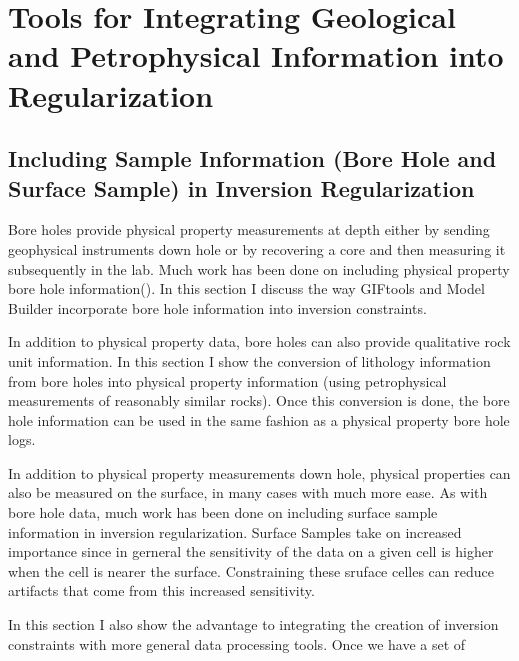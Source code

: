 
\chapter{Tools for Integrating Geological and Petrophysical Information into Regularization}
\label{ch:GIFtools}

\section{Including Sample Information (Bore Hole and Surface Sample) in Inversion Regularization}
\label{sec:BHandSS}

Bore holes provide physical property measurements at depth either by sending geophysical instruments down hole or by recovering a core and then measuring it subsequently in the lab.  Much work has been done on including physical property bore hole information(\cite{williams2008geologically}). In this section I discuss the way GIFtools and Model Builder incorporate bore hole information into inversion constraints.

In addition to physical property data, bore holes can also provide qualitative rock unit information. In this section I show the conversion of lithology information from bore holes into physical property information (using petrophysical measurements of reasonably similar rocks). Once this conversion is done,  the bore hole information can be used in the same fashion as a physical property bore hole logs.

In addition to physical property measurements down hole, physical properties can also be measured on the surface, in many cases with much more ease. As with bore hole data, much work  has been done on including surface sample information in inversion regularization. Surface Samples take on increased importance since in gerneral the sensitivity of the data on a given cell is higher when the cell is nearer the surface. Constraining these sruface celles can reduce artifacts that come from this increased sensitivity.

In this section I also show the advantage to integrating the creation of inversion constraints with more general data processing tools. Once we have a set of 

